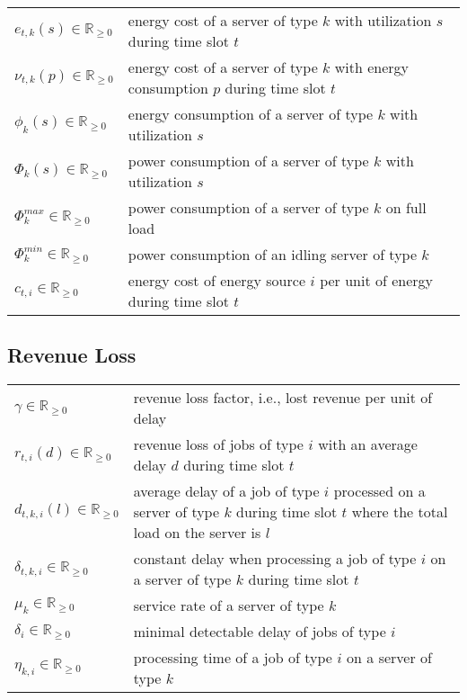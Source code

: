 \nopagebreak\begin{tabularx}{\textwidth}{p{100pt}X}
    $e_{t,k}(s) \in \mathbb{R}_{\geq 0}$ & energy cost of a server of type $k$ with utilization $s$ during time slot $t$ \\
    $\nu_{t,k}(p) \in \mathbb{R}_{\geq 0}$ & energy cost of a server of type $k$ with energy consumption $p$ during time slot $t$ \\
    $\phi_k(s) \in \mathbb{R}_{\geq 0}$ & energy consumption of a server of type $k$ with utilization $s$ \\
    $\Phi_k(s) \in \mathbb{R}_{\geq 0}$ & power consumption of a server of type $k$ with utilization $s$ \\
    $\Phi_k^{max} \in \mathbb{R}_{\geq 0}$ & power consumption of a server of type $k$ on full load \\
    $\Phi_k^{min} \in \mathbb{R}_{\geq 0}$ & power consumption of an idling server of type $k$ \\
    $c_{t,i} \in \mathbb{R}_{\geq 0}$ & energy cost of energy source $i$ per unit of energy during time slot $t$ \\
\end{tabularx}

\subsection*{Revenue Loss}

\nopagebreak\begin{tabularx}{\textwidth}{p{100pt}X}
    $\gamma \in \mathbb{R}_{\geq 0}$ & revenue loss factor, i.e., lost revenue per unit of delay \\
    $r_{t,i}(d) \in \mathbb{R}_{\geq 0}$ & revenue loss of jobs of type $i$ with an average delay $d$ during time slot $t$ \\
    $d_{t,k,i}(l) \in \mathbb{R}_{\geq 0}$ & average delay of a job of type $i$ processed on a server of type $k$ during time slot $t$ where the total load on the server is $l$ \\
    $\delta_{t,k,i} \in \mathbb{R}_{\geq 0}$ & constant delay when processing a job of type $i$ on a server of type $k$ during time slot $t$ \\
    $\mu_k \in \mathbb{R}_{\geq 0}$ & service rate of a server of type $k$ \\
    $\delta_i \in \mathbb{R}_{\geq 0}$ & minimal detectable delay of jobs of type $i$ \\
    $\eta_{k,i} \in \mathbb{R}_{\geq 0}$ & processing time of a job of type $i$ on a server of type $k$ \\
\end{tabularx}

